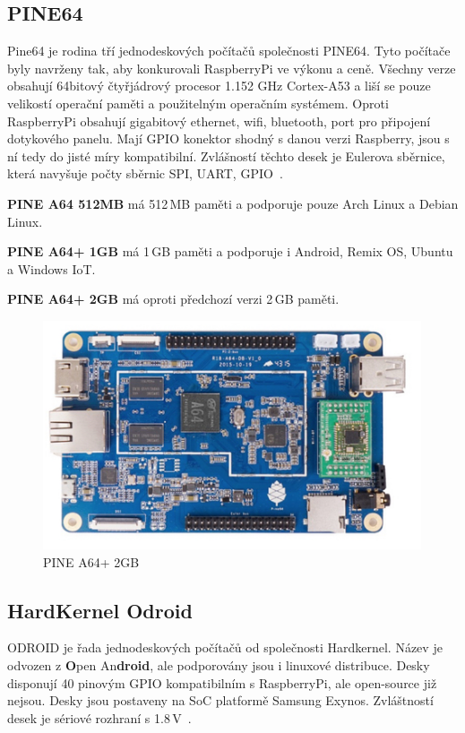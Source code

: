 	\subsection{PINE64}
Pine64 je rodina tří jednodeskových počítačů společnosti PINE64. Tyto počítače byly navrženy tak, aby konkurovali RaspberryPi ve výkonu a ceně. Všechny verze obsahují 64bitový čtyřjádrový procesor 1.152 GHz Cortex-A53 a liší se pouze velikostí operační paměti a použitelným operačním systémem. Oproti RaspberryPi obsahují gigabitový ethernet, wifi, bluetooth, port pro připojení dotykového panelu. Mají GPIO konektor shodný s danou verzi Raspberry, jsou s ní tedy do jisté míry kompatibilní. Zvlášností těchto desek je Eulerova sběrnice, která navyšuje počty sběrnic SPI, UART, GPIO~\cite{Pine64}.

\textbf{PINE A64 512MB} má 512\,MB paměti a podporuje pouze Arch Linux a Debian Linux.

\textbf{PINE A64+ 1GB} má 1\,GB paměti a podporuje i Android, Remix OS, Ubuntu a Windows IoT.

\textbf{PINE A64+ 2GB} má oproti předchozí verzi 2\,GB paměti.

\begin{figure}[!h]
  \begin{center}
    \includegraphics[scale=0.65]{obrazky/embed_pine}
  \end{center}
  \caption{PINE A64+ 2GB~\cite{Pine64}}
\end{figure}

\newpage

\subsection{HardKernel Odroid}
	\label{KapKernel}
ODROID je řada jednodeskových počítačů od společnosti Hardkernel. Název je odvozen z \textbf{O}pen An\textbf{droid}, ale podporovány jsou i linuxové distribuce. Desky disponují 40 pinovým GPIO kompatibilním s RaspberryPi, ale open-source již nejsou. Desky jsou postaveny na SoC platformě Samsung Exynos. Zvláštností desek je sériové rozhraní s 1.8\,V~\cite{HardKernel}.
	
